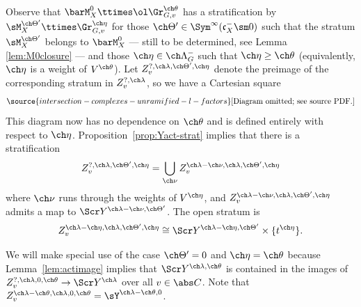 Observe that $\barM_X^0 \ttimes \ol\Gr^{\ch\theta}_{G,v}$ has
a stratification by $\sM_{X}^{\ch\Theta'} \ttimes \Gr^{\ch\eta}_{G,v}$ for those $\ch\Theta' \in \Sym^\infty(\mathfrak c_X^- \sm 0)$ such that the stratum  $\sM_{X}^{\ch\Theta'}$ belongs to $\barM_X^0$ --- still to be determined, see Lemma \ref{lem:M0closure} ---
and those $\ch\eta \in \ch\Lambda^-_G$ such that $\ch\eta \ge \ch\theta$ (equivalently, $\ch\eta$ is a weight of $V^{\ch\theta}$).
Let $Z^{?,\ch\lambda,\ch\Theta',\ch\eta}_v$ denote the
preimage of the corresponding stratum in $Z^{?,\ch\lambda}_v$,
so we have a Cartesian square
\begin{equation} \label{e:Z0act-diagram}
\source{intersection-complexes-unramified-l-factors}
\text{[Diagram omitted; see source PDF.]}
\end{equation}
This diagram now has no dependence on $\ch\theta$ and is defined
entirely with respect to $\ch\eta$.
Proposition~\ref{prop:Yact-strat} implies that there is a
stratification
\[ Z_v^{?,\ch\lambda,\ch\Theta', \ch\eta} = \bigcup_{\ch\nu} Z_v^{\ch\lambda-\ch\nu,\ch\lambda,\ch\Theta', \ch\eta} \]
where $\ch\nu$ runs through the weights of $V^{\ch\eta}$, and
$Z_v^{\ch\lambda-\ch\nu,\ch\lambda,\ch\Theta',\ch\eta}$
admits a map to $\Scr Y^{\ch\lambda-\ch\nu,\ch\Theta'}$.
The open stratum is
\[ Z_v^{\ch\lambda-\ch\eta,\ch\lambda,\ch\Theta',\ch\eta} \cong
\Scr Y^{\ch\lambda-\ch\eta,\ch\Theta'} \times \{ t^{\ch\eta}\}. \]

We will make special use of the case $\ch\Theta'=0$ and $\ch\eta = \ch\theta$
because
Lemma~\ref{lem:actimage} implies that $\Scr Y^{\ch\lambda,\ch\theta}$
is contained in the images of $Z_v^{?,\ch\lambda,0,\ch\theta} \to \Scr Y^{\ch\lambda}$
over all $v \in \abs C$.
Note that $Z_v^{\ch\lambda-\ch\theta,\ch\lambda,0,\ch\theta} = \sY^{\ch\lambda-\ch\theta,0}$.



